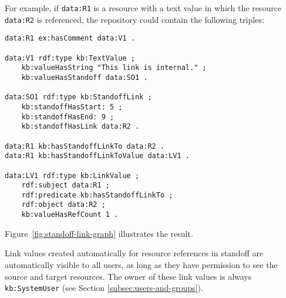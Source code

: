 \documentclass[12pt, a4paper]{article}
\begin{document}
For example, if \texttt{data:R1} is a resource with a text value in which the resource \texttt{data:R2} is referenced, the repository could contain the following triples:

\begin{verbatim}
data:R1 ex:hasComment data:V1 .

data:V1 rdf:type kb:TextValue ;
    kb:valueHasString "This link is internal." ;
    kb:valueHasStandoff data:SO1 .

data:SO1 rdf:type kb:StandoffLink ;
    kb:standoffHasStart: 5 ;
    kb:standoffHasEnd: 9 ;
    kb:standoffHasLink data:R2 .

data:R1 kb:hasStandoffLinkTo data:R2 .
data:R1 kb:hasStandoffLinkToValue data:LV1 . 

data:LV1 rdf:type kb:LinkValue ;            
    rdf:subject data:R1 ;
    rdf:predicate kb:hasStandoffLinkTo ;
    rdf:object data:R2 ;
    kb:valueHasRefCount 1 .
\end{verbatim}

Figure~\ref{fig:standoff-link-graph} illustrates the result.

Link values created automatically for resource references in standoff are automatically visible to all users, as long as they have permission to see the source and target resources. The owner of these link values is always \texttt{kb:SystemUser} (see Section \ref{subsec:users-and-groups}).
\end{document}
